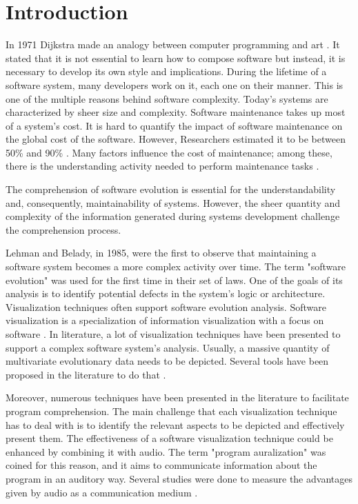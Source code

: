 \chapter{Introduction}

In 1971 Dijkstra made an analogy between computer programming and art \cite{Dijkstra1971a}.
It stated that it is not essential to learn how to compose software but instead, it is necessary to develop its own style and implications. 
During the lifetime of a software system, many developers work on it, each one on their manner. This is one of the multiple reasons behind software complexity. 
Today's systems are characterized by sheer size and complexity. Software maintenance takes up most of a system's cost. 
It is hard to quantify the impact of software maintenance on the global cost of the software. 
However, Researchers estimated it to be between 50\% and 90\% \cite{Davis1995} \cite{Sommerville1995}\cite{Erlikh2000} \cite{seacord2003}.
Many factors influence the cost of maintenance; among these, there is the understanding activity needed to perform maintenance tasks \cite{Corbi1989}. 

The comprehension of software evolution is essential for the understandability and, consequently, maintainability of systems.
However, the sheer quantity and complexity of the information generated during systems development challenge the comprehension process.

Lehman and Belady, in 1985, were the first to observe that maintaining a software system becomes a more complex activity over time. \cite{Lehman1985}
The term "software evolution" was used for the first time in their set of laws. 
One of the goals of its analysis is to identify potential defects in the system's logic or architecture. 
Visualization techniques often support software evolution analysis.
\bigbreak
Software visualization is a specialization of information visualization with a focus on software \cite{Lanza2003}. In literature, a lot of visualization techniques have been presented to support 
a complex software system's analysis.
Usually, a massive quantity of multivariate evolutionary data needs to be depicted. Several tools have been proposed in the literature to do that \cite{Merino2018a}.

Moreover, numerous techniques have been presented in the literature to facilitate program comprehension. 
The main challenge that each visualization technique has to deal with is to identify the relevant aspects to be depicted and effectively present them. 
The effectiveness of a software visualization technique could be enhanced by combining it with audio. 
The term "program auralization" was coined for this reason, and it aims to communicate information about the program in an auditory way.
Several studies were done to measure the advantages given by audio as a communication medium \cite{Alty1995}. 


